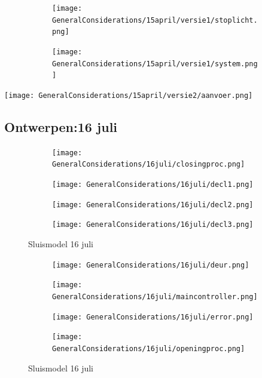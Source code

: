 \documentclass{article}
\begin{document}
	
	\begin{figure}
		\centering
		\begin{subfigure}{0.45\linewidth}
			\texttt{[image: GeneralConsiderations/15april/versie1/stoplicht.png]}
			\caption{}
			\label{fig:1a}
		\end{subfigure}\hfill
		\begin{subfigure}{0.45\linewidth}
			\texttt{[image: GeneralConsiderations/15april/versie1/system.png]}
			\caption{}
			\label{fig:1a}
		\end{subfigure}
	\end{figure}
	
	
	\texttt{[image: GeneralConsiderations/15april/versie2/aanvoer.png]}
	\newpage
	\subsection{Ontwerpen:16 juli }
	\begin{figure}
		\centering
		\begin{subfigure}{0.45\linewidth}
			\texttt{[image: GeneralConsiderations/16juli/closingproc.png]}
			\caption{}
			\label{fig:1a}
		\end{subfigure}\hfill
		\begin{subfigure}{0.45\linewidth}
			\texttt{[image: GeneralConsiderations/16juli/decl1.png]}
			\caption{}
			\label{fig:1a}
		\end{subfigure}
		
		\begin{subfigure}{0.45\linewidth}
			\texttt{[image: GeneralConsiderations/16juli/decl2.png]}
			\caption{}
			\label{fig:1a}
		\end{subfigure}\hfill
		\begin{subfigure}{0.45\linewidth}
			\texttt{[image: GeneralConsiderations/16juli/decl3.png]}
			\caption{}
			\label{fig:1a}
		\end{subfigure}
		\caption{Sluismodel 16 juli}
		\label{fig:1}
	\end{figure}
	
	\begin{figure}
		\centering
		\begin{subfigure}{0.45\linewidth}
			\texttt{[image: GeneralConsiderations/16juli/deur.png]}
			\caption{}
			\label{fig:1a}
		\end{subfigure}\hfill
		\begin{subfigure}{0.45\linewidth}
			\texttt{[image: GeneralConsiderations/16juli/maincontroller.png]}
			\caption{}
			\label{fig:1a}
		\end{subfigure}
		
		\begin{subfigure}{0.45\linewidth}
			\texttt{[image: GeneralConsiderations/16juli/error.png]}
			\caption{}
			\label{fig:1a}
		\end{subfigure}\hfill
		\begin{subfigure}{0.45\linewidth}
			\texttt{[image: GeneralConsiderations/16juli/openingproc.png]}
			\caption{}
			\label{fig:1a}
		\end{subfigure}
		\caption{Sluismodel 16 juli}
		\label{fig:1}
	\end{figure}
	
\end{document}
